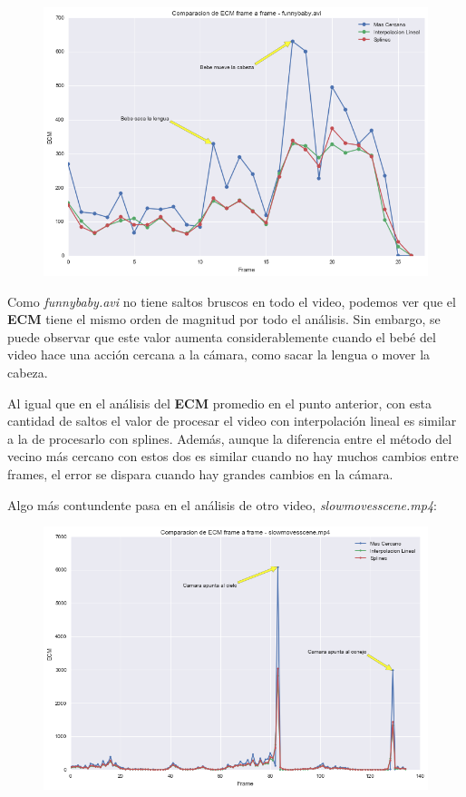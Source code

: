 \begin{figure}[H]
\centering
\includegraphics[width=.95\textwidth]{graficos/ecm_frame_funnybaby.png}
\end{figure}

Como \textit{funnybaby.avi} no tiene saltos bruscos en
todo el video, podemos ver que el \textbf{ECM} tiene el mismo orden de
magnitud por todo el an\'alisis. Sin embargo, se puede observar que este valor
aumenta considerablemente cuando el beb\'e del video hace una acci\'on cercana a
la c\'amara, como sacar la lengua o mover la cabeza.

Al igual que en el an\'alisis del \textbf{ECM} promedio en el punto anterior,
con esta cantidad de saltos el valor de procesar el video con interpolaci\'on
lineal es similar a la de procesarlo con splines. Adem\'as, aunque la diferencia
entre el m\'etodo del vecino m\'as cercano con estos dos es similar cuando no hay
muchos cambios entre frames, el error se dispara cuando hay grandes cambios en
la c\'amara.

Algo m\'as contundente pasa en el an\'alisis de otro video,
\textit{slowmovesscene.mp4}:

\begin{figure}[H]
\centering
\includegraphics[width=.95\textwidth]{graficos/ecm_frame_slowmovescene.png}
\end{figure}

